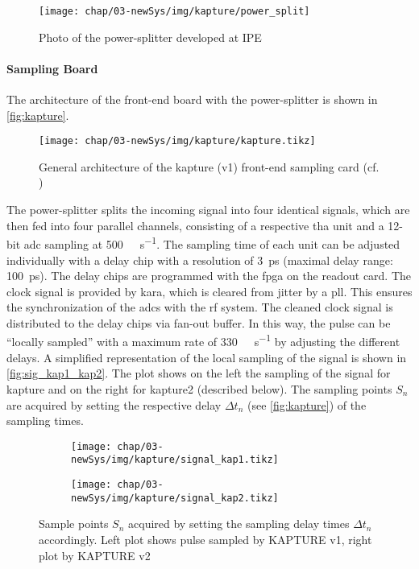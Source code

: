\begin{figure}[tb]
	\centering
	\texttt{[image: chap/03-newSys/img/kapture/power\_split]}
	\caption{Photo of the power-splitter developed at IPE}
	\label{fig:power_splitter}
\end{figure}

\paragraph{Sampling Board}
The architecture of the front-end board with the power-splitter is shown in \autoref{fig:kapture}. 
\begin{figure}[H]
	\centering
	\texttt{[image: chap/03-newSys/img/kapture/kapture.tikz]}
	\caption[General architecture of the KAPTURE system]{General architecture of the \Gls{kapture} (v1) front-end sampling card (cf. \cite[p.2]{caselleKAP})}
	\label{fig:kapture}
\end{figure}
The power-splitter splits the incoming signal into four identical signals, which are then fed into four parallel channels, consisting of a respective \gls{tha} unit and a 12-bit \gls{adc} sampling at \SI{500}{\mega\sample\per\second}. 
The sampling time of each unit can be adjusted individually with a delay chip with a resolution of \SI{3}{\pico \second} (maximal delay range: \SI{100}{\pico \second}). 
The delay chips are programmed with the \gls{fpga} on the readout card.
The clock signal is provided by \gls{kara}, which is cleared from jitter by a \gls{pll}. 
This ensures the synchronization of the \glspl{adc} with the \gls{rf} system. 
The cleaned clock signal is distributed to the delay chips via fan-out buffer. \cite{caselleKAP}
In this way, the pulse can be ``locally sampled'' with a maximum rate of \SI{330}{\giga\sample\per\second} by adjusting the different delays. \newline
A simplified representation of the local sampling of the signal is shown in \autoref{fig:sig_kap1_kap2}.
The plot shows on the left the sampling of the signal for \gls{kapture} and on the right for \gls{kapture2} (described below).
The sampling points $S_n$ are acquired by setting the respective delay $\Delta t_n$ (see \autoref{fig:kapture}) of the sampling times. 
\begin{figure}[tb]
	\centering
	\begin{subfigure}{0.48\textwidth}
		\centering
		\texttt{[image: chap/03-newSys/img/kapture/signal\_kap1.tikz]}  
		\label{fig:sig_kap1}
	\end{subfigure}
	\hfill
	\begin{subfigure}{0.48\textwidth}
		\centering
		\texttt{[image: chap/03-newSys/img/kapture/signal\_kap2.tikz]}  
		\label{fig:sig_kap2}
	\end{subfigure}
	\caption[KAPTURE Pulse Sampling]{Sample points $S_n$ acquired by setting the sampling delay times $\Delta t_n$ accordingly. Left plot shows pulse sampled by KAPTURE v1, right plot by KAPTURE v2}
	\label{fig:sig_kap1_kap2}
\end{figure}

